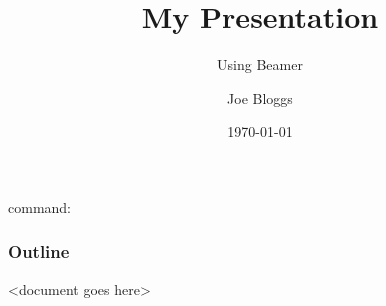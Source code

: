 \documentclass{beamer}
\title{My Presentation}
\subtitle{Using Beamer}
\author{Joe Bloggs}
\institute{University of ShareLaTeX}
\date{\today}
\begin{document}
\titlepage command:

\begin{frame}
  \titlepage
\end{frame}

\begin{frame}
  \frametitle{Outline}
  \tableofcontents
\end{frame}

<document goes here>
\end{document}
